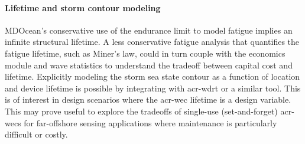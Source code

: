     \paragraph{Lifetime and storm contour modeling}
    MDOcean's conservative use of the endurance limit to model fatigue implies an infinite structural lifetime.
    A less conservative fatigue analysis that quantifies the fatigue lifetime, such as Miner's law, could in turn couple with the economics module and wave statistics to understand the tradeoff between capital cost and lifetime.
    Explicitly modeling the storm sea state contour as a function of location and device lifetime is possible by integrating with \gls{acr-wdrt} or a similar tool.
    This is of interest in design scenarios where the \gls{acr-wec} lifetime is a design variable.
    This may prove useful to explore the tradeoffs of single-use (set-and-forget) \glspl{acr-wec} for far-offshore sensing applications where maintenance is particularly difficult or costly.
    
